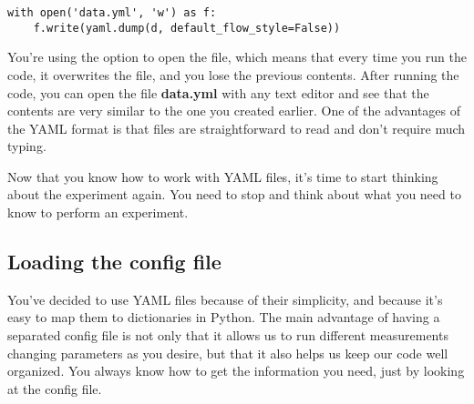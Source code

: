 \begin{verbatim}
with open('data.yml', 'w') as f:
    f.write(yaml.dump(d, default_flow_style=False))
\end{verbatim}

You're using the  option to open the file, which means that every time you run the code, it overwrites the file, and you lose the previous contents. After running the code, you can open the file \textbf{data.yml} with any text editor and see that the contents are very similar to the one you created earlier. One of the advantages of the YAML format is that files are straightforward to read and don't require much typing.





Now that you know how to work with YAML files, it's time to start thinking about the experiment again. You need to stop and think about what you need to know to perform an experiment.


\subsection{Loading the config file}\label{subsec:loading-the-config}
You've decided to use YAML files because of their simplicity, and because it's easy to map them to dictionaries in Python. The main advantage of having a separated config file is not only that it allows us to run different measurements changing parameters as you desire, but that it also helps us keep our code well organized. You always know how to get the information you need, just by looking at the config file.

